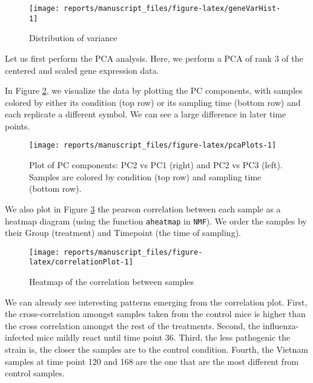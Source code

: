 \documentclass[9pt,a4paper,]{extarticle}
\begin{document}
\begin{figure}[H]

{\centering \texttt{[image: reports/manuscript\_files/figure-latex/geneVarHist-1]} 

}

\caption{Distribution of variance}\label{fig:geneVarHist}
\end{figure}

Let us first perform the PCA analysis. Here, we perform a PCA of rank 3 of the
centered and scaled gene expression data.

In Figure \ref{fig:pcaPlots}, we visualize the data by plotting the PC components, with samples colored by either its
condition (top row) or its sampling time (bottom row) and each replicate a different symbol. We can see a large difference in later time points.

\begin{figure}[H]

{\centering \texttt{[image: reports/manuscript\_files/figure-latex/pcaPlots-1]} 

}

\caption{Plot of PC components: PC2 vs PC1 (right) and PC2 vs PC3 (left). Samples are colored by condition (top row) and sampling time (bottom row).}\label{fig:pcaPlots}
\end{figure}

We also plot in Figure \ref{fig:correlationPlot} the pearson correlation between each sample as a heatmap diagram (using the function \texttt{aheatmap} in \texttt{NMF}). We order the
samples by their Group (treatment) and Timepoint (the time of sampling).

\begin{figure}[H]

{\centering \texttt{[image: reports/manuscript\_files/figure-latex/correlationPlot-1]} 

}

\caption{Heatmap of the correlation between samples}\label{fig:correlationPlot}
\end{figure}

We can already see interesting patterns emerging from the correlation plot.
First, the cross-correlation amongst samples taken from the control mice is
higher than the cross correlation amongst the rest of the treatments. Second,
the influenza-infected mice mildly react until time point 36. Third, the less
pathogenic the strain is, the closer the samples are to the control condition.
Fourth, the Vietnam samples at time point 120 and 168 are the one that are the
most different from control samples.
\end{document}
